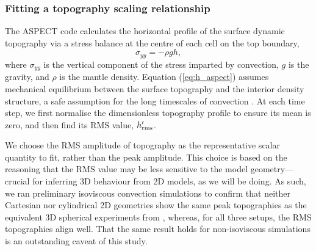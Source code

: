 \subsubsection{Fitting a topography scaling relationship} \label{sec:methods-hscaling}

The ASPECT code calculates the horizontal profile of the surface dynamic topography via a stress balance at the centre of each cell on the top boundary,
\begin{equation} \label{eq:h_aspect}
    \sigma_{yy} = - \rho g h,
\end{equation} 
where $\sigma_{yy}$ is the vertical component of the stress imparted by convection, $g$ is the gravity, and $\rho$ is the mantle density. Equation (\ref{eq:h_aspect}) assumes mechanical equilibrium between the surface topography and the interior density structure, a safe assumption for the long timescales of convection \citep[e.g.,][]{ricard_physics_2015}. At each time step, we first normalise the dimensionless topography profile to ensure its mean is zero, and then find its RMS value, $h_{\rm rms}^\prime$. 

We choose the RMS amplitude of topography as the representative scalar quantity to fit, rather than the peak amplitude. This choice is based on the reasoning that the RMS value may be less sensitive to the model geometry---crucial for inferring 3D behaviour from 2D models, as we will be doing. As such, we ran preliminary isoviscous convection simulations to confirm that neither Cartesian nor cylindrical 2D geometries show the same peak topographies as the equivalent 3D spherical experiments from \citet{lees_gravity_2020}, whereas, for all three setups, the RMS topographies align well. That the same result holds for non-isoviscous simulations is an outstanding caveat of this study.



